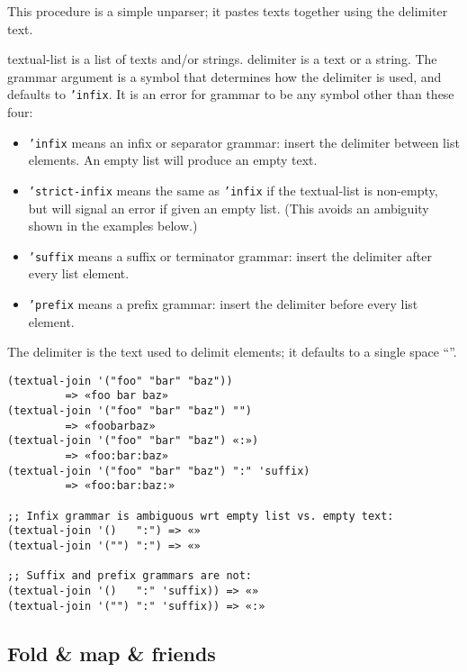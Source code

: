 \begin{entry}{%
  }

  This procedure is a simple unparser; it
  pastes texts together using the delimiter text.

  textual-list is a list of texts and/or strings. delimiter is a text
  or a string. The grammar argument is a symbol that determines how
  the delimiter is used, and defaults to
  \texttt{'infix}. It is an error for grammar to be
  any symbol other than these four:

\begin{itemize}
  \tightlist
\item \texttt{'infix} means an infix or separator
  grammar: insert the delimiter between list elements. An empty list
  will produce an empty text.
\item \texttt{'strict-infix} means the same as
  \texttt{'infix} if the textual-list is non-empty,
  but will signal an error if given an empty list. (This avoids an
  ambiguity shown in the examples below.)
\item \texttt{'suffix} means a suffix or terminator
  grammar: insert the delimiter after every list element.
\item \texttt{'prefix} means a prefix grammar: insert
  the delimiter before every list element.
\end{itemize}

The delimiter is the text used to delimit elements; it defaults to a
single space ``''.

\begin{verbatim}
(textual-join '("foo" "bar" "baz"))
         => «foo bar baz»
(textual-join '("foo" "bar" "baz") "")
         => «foobarbaz»
(textual-join '("foo" "bar" "baz") «:»)
         => «foo:bar:baz»
(textual-join '("foo" "bar" "baz") ":" 'suffix)
         => «foo:bar:baz:»

;; Infix grammar is ambiguous wrt empty list vs. empty text:
(textual-join '()   ":") => «»
(textual-join '("") ":") => «»

;; Suffix and prefix grammars are not:
(textual-join '()   ":" 'suffix)) => «»
(textual-join '("") ":" 'suffix)) => «:»
\end{verbatim}
\end{entry}

\subsection{{Fold \& map \& friends}}\label{fold-map-friends}

